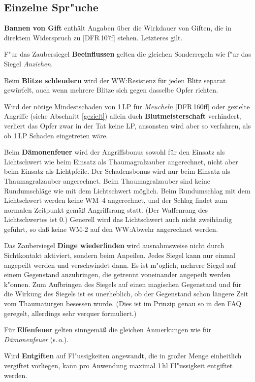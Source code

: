\documentclass[10pt,a4paper,germanpar]{article}
\begin{document}
\subsection{Einzelne Spr"uche}

\textbf{Bannen von Gift} enthält Angaben über die Wirkdauer von
Giften, die in direktem Widerspruch zu [DFR\,107f] stehen. Letzteres
gilt.

F"ur das Zaubersiegel \textbf{Beeinflussen} gelten die gleichen
Sonderregeln wie f"ur das Siegel \emph{Anziehen}.

Beim \textbf{Blitze schleudern} wird der WW:Resistenz für jeden Blitz separat
gewürfelt, auch wenn mehrere Blitze sich gegen dasselbe Opfer richten.

Wird der nötige Mindestschaden von 1\,LP für \emph{Meucheln}
[DFR\,160ff] oder gezielte Angriffe (siehe Abschnitt \ref{gezielt})
allein duch \textbf{Blutmeisterschaft} verhindert, verliert das Opfer
zwar in der Tat keine LP, ansonsten wird aber so verfahren, als ob
1\,LP Schaden eingetreten wäre.

Beim \textbf{Dämonenfeuer} wird der Angriffsbonus sowohl für den
Einsatz als Lichtschwert wie beim Einsatz als Thaumagralzauber
angerechnet, nicht aber beim Einsatz als Lichtpfeile. Der
Schadensbonus wird nur beim Einsatz als Thaumagralzauber
angerechnet. Beim Thaumagralzauber sind keine Rundumschläge wie mit
dem Lichtschwert möglich. Beim Rundumschlag mit dem Lichtschwert
werden keine WM--4 angerechnet, und der Schlag findet zum normalen
Zeitpunkt gemäß Angriffsrang statt. (Der Waffenrang des Lichtschwertes
ist 0.) Generell wird das Lichtschwert auch nicht zweihändig geführt,
so daß keine WM-2 auf den WW:Abwehr angerechnet werden.

Das Zaubersiegel \textbf{Dinge wiederfinden} wird ausnahmsweise nicht
durch Sichtkontakt aktiviert, sondern beim Anpeilen. Jedes Siegel kann 
nur einmal angepeilt werden und verschwindet dann. Es ist m"oglich,
mehrere Siegel auf einem Gegenstand anzubringen, die getrennt
voneinander angepeilt werden k"onnen. Zum Aufbringen des Siegels auf
einen magischen Gegenstand und für die Wirkung des Siegels ist es
unerheblich, ob der Gegenstand schon längere Zeit vom Thaumaturgen
besessen wurde. (Dies ist im Prinzip genau so in den FAQ geregelt,
allerdings sehr verquer formuliert.)

Für \textbf{Elfenfeuer} gelten sinngemäß die gleichen Anmerkungen
wie für \emph{Dämonenfeuer} (s.\,o.).

Wird \textbf{Entgiften} auf Fl"ussigkeiten angewandt, die in großer
Menge einheitlich vergiftet vorliegen, kann pro Anwendung maximal
1\,hl Fl"ussigkeit entgiftet werden.
\end{document}
